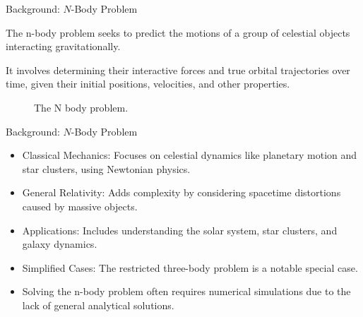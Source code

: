 \documentclass[10pt, xcolor = svgnames, aspectratio=43]{beamer} %
\begin{document}
\begin{frame}[fragile]{Background: $N$-Body Problem}
\begin{minipage}{0.45\textwidth}
The n-body problem seeks to predict the motions of a group of celestial objects interacting gravitationally.

It involves determining their interactive forces and true orbital trajectories over time, given their initial positions, velocities, and other properties.
\end{minipage}
\hspace{20pt}
\begin{minipage}{0.45\textwidth}
\begin{figure}
\caption{The N body problem.}
\label{The-N-body-problem}
\end{figure}
\end{minipage}
\end{frame}


\begin{frame}{Background: $N$-Body Problem}
\begin{itemize}
	\item Classical Mechanics: Focuses on celestial dynamics like planetary motion and star clusters, using Newtonian physics.
	\item General Relativity: Adds complexity by considering spacetime distortions caused by massive objects.
	\item Applications: Includes understanding the solar system, star clusters, and galaxy dynamics.
	\item Simplified Cases: The restricted three-body problem is a notable special case.
	\item Solving the n-body problem often requires numerical simulations due to the lack of general analytical solutions.
\end{itemize}
\end{frame}
\end{document}
